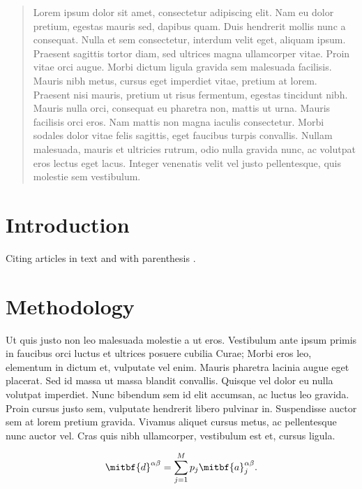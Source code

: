 \begin{abstract}
Lorem ipsum dolor sit amet, consectetur adipiscing elit. Nam eu dolor pretium,
egestas mauris sed, dapibus quam. Duis hendrerit mollis nunc a consequat. Nulla
et sem consectetur, interdum velit eget, aliquam ipsum. Praesent sagittis
tortor diam, sed ultrices magna ullamcorper vitae. Proin vitae orci augue.
Morbi dictum ligula gravida sem malesuada facilisis. Mauris nibh metus, cursus
eget imperdiet vitae, pretium at lorem. Praesent nisi mauris, pretium ut risus
fermentum, egestas tincidunt nibh. Mauris nulla orci, consequat eu pharetra
non, mattis ut urna. Mauris facilisis orci eros. Nam mattis non magna iaculis
consectetur. Morbi sodales dolor vitae felis sagittis, eget faucibus turpis
convallis. Nullam malesuada, mauris et ultricies rutrum, odio nulla gravida
nunc, ac volutpat eros lectus eget lacus. Integer venenatis velit vel justo
pellentesque, quis molestie sem vestibulum.
\end{abstract}

\section{Introduction}

Citing articles in text \citet{Asgharzadeh2007} and with parenthesis
\citep{Braitenberg2011}.


\section{Methodology}

Ut quis justo non leo malesuada molestie a ut eros. Vestibulum ante ipsum
primis in faucibus orci luctus et ultrices posuere cubilia Curae; Morbi eros
leo, elementum in dictum et, vulputate vel enim. Mauris pharetra lacinia augue
eget placerat. Sed id massa ut massa blandit convallis. Quisque vel dolor eu
nulla volutpat imperdiet. Nunc bibendum sem id elit accumsan, ac luctus leo
gravida. Proin cursus justo sem, vulputate hendrerit libero pulvinar in.
Suspendisse auctor sem at lorem pretium gravida. Vivamus aliquet cursus metus,
ac pellentesque nunc auctor vel. Cras quis nibh ullamcorper, vestibulum est et,
cursus ligula.

\begin{equation}
    \mitbf{d}^{\alpha\beta} = \sum\limits_{j=1}^{M} p_j \mitbf{a}_j^{\alpha\beta}.
    \label{eq:myeq}
\end{equation}

